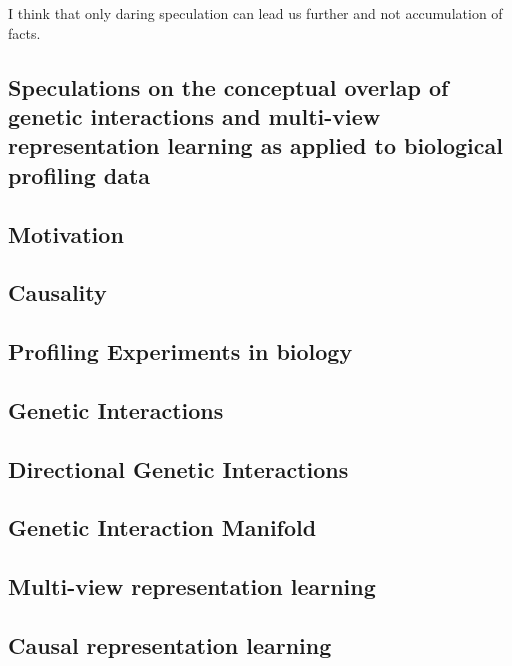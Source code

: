 \begin{savequote}[75mm]
I think that only daring speculation can lead us further and not accumulation of facts.
\end{savequote}

\begin{flushleft}
\chapter{Speculations on the conceptual overlap of genetic interactions and multi-view representation learning as applied to biological profiling data}

\section{Motivation}

\section{Causality}

\section{Profiling Experiments in biology}

\section{Genetic Interactions}

\section{Directional Genetic Interactions}

\section{Genetic Interaction Manifold}

\section{Multi-view representation learning}

\section{Causal representation learning}


\end{flushleft}
